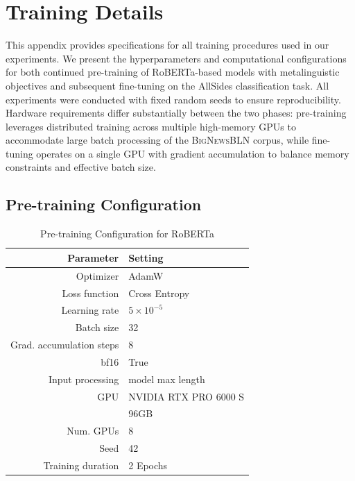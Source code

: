 \chapter{Training Details}
\label{appendix:training-configurations}

This appendix provides specifications for all training procedures used in our experiments. We present the hyperparameters and computational configurations for both continued pre-training of RoBERTa-based models with metalinguistic objectives and subsequent fine-tuning on the AllSides classification task. All experiments were conducted with fixed random seeds to ensure reproducibility. Hardware requirements differ substantially between the two phases: pre-training leverages distributed training across multiple high-memory GPUs to accommodate large batch processing of the \textsc{BigNewsBLN} corpus, while fine-tuning operates on a single GPU with gradient accumulation to balance memory constraints and effective batch size.

\section{Pre-training Configuration}

\begin{table}[ht]
    \centering
    \small
    \begin{tabular}{@{}rl@{}}
        \toprule
        \textbf{Parameter} & \textbf{Setting} \\
        \midrule
        Optimizer & AdamW \\
        Loss function & Cross Entropy \\
        Learning rate & $5 \times 10^{-5}$ \\
        Batch size & 32 \\
        Grad. accumulation steps & 8 \\
        bf16 & True \\
        Input processing & model max length\\
        GPU & NVIDIA RTX PRO 6000 S \\
        & 96GB \\
        Num. GPUs & 8 \\
        Seed & 42 \\
        Training duration & 2 Epochs\\
        \bottomrule
    \end{tabular}
    \caption{Pre-training Configuration for RoBERTa}
    \label{tab:pretraining_config}
\end{table}

